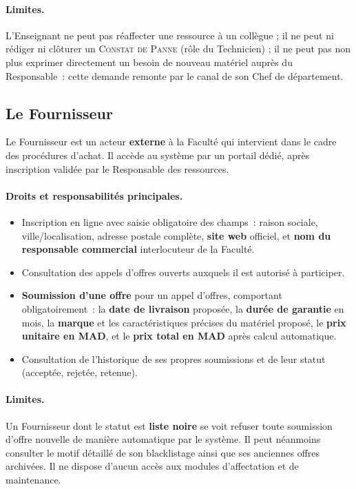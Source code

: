 \documentclass[a4paper,11pt,openany]{report}
\newcommand{\constat}{\textsc{Constat de Panne}}
\newcommand{\mad}{MAD}
\begin{document}
\paragraph{Limites.} L'Enseignant ne peut pas réaffecter une
ressource à un collègue ; il ne peut ni rédiger ni clôturer un
\constat{} (rôle du Technicien) ; il ne peut pas non plus
exprimer directement un besoin de nouveau matériel auprès du
Responsable~: cette demande remonte par le canal de son Chef de
département.

\subsection{Le Fournisseur}

Le Fournisseur est un acteur \textbf{externe} à la Faculté qui
intervient dans le cadre des procédures d'achat. Il accède au
système par un portail dédié, après inscription validée par le
Responsable des ressources.

\paragraph{Droits et responsabilités principales.}
\begin{itemize}
  \item Inscription en ligne avec saisie obligatoire des champs~:
    raison sociale, ville/localisation, adresse postale complète,
    \textbf{site web} officiel, et \textbf{nom du responsable
    commercial} interlocuteur de la Faculté.
  \item Consultation des appels d'offres ouverts auxquels il est
    autorisé à participer.
  \item \textbf{Soumission d'une offre} pour un appel d'offres,
    comportant obligatoirement~: la \textbf{date de livraison}
    proposée, la \textbf{durée de garantie} en mois, la
    \textbf{marque} et les caractéristiques précises du matériel
    proposé, le \textbf{prix unitaire en \mad}, et le
    \textbf{prix total en \mad} après calcul automatique.
  \item Consultation de l'historique de ses propres soumissions
    et de leur statut (acceptée, rejetée, retenue).
\end{itemize}

\paragraph{Limites.} Un Fournisseur dont le statut est
\textbf{liste noire} se voit refuser toute soumission d'offre
nouvelle de manière automatique par le système. Il peut
néanmoins consulter le motif détaillé de son blacklistage ainsi
que ses anciennes offres archivées. Il ne dispose d'aucun accès
aux modules d'affectation et de maintenance.
\end{document}
